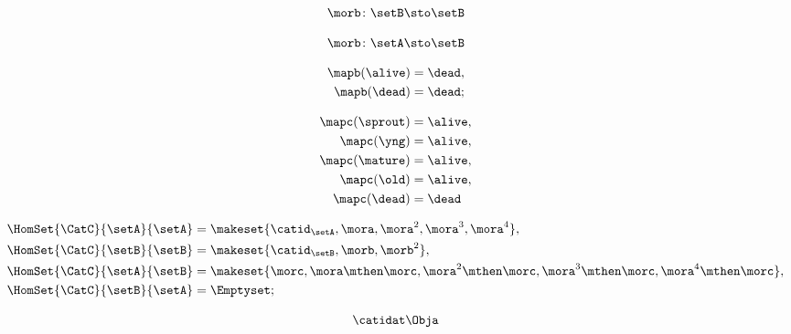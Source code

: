 \begin{forslides}
    \begin{equation}
        \label{eq:semicats-slides-82a}
        \morb \colon \setB \sto \setB
    \end{equation}
    
    \begin{equation}
        \label{eq:semicats-slides-82b}
        \morb \colon \setA \sto \setB
    \end{equation}

    \begin{equation}
        \label{eq:semicats-slides-83}
        \begin{aligned}
            \mapb(\alive) & =  \dead, \\
            \mapb(\dead)  & =  \dead;
        \end{aligned}
    \end{equation}

    \begin{equation}
        \label{eq:semicats-slides-84}
        \begin{aligned}
            \mapc(\sprout) & = \alive, \\
            \mapc(\yng)    & =  \alive, \\
            \mapc(\mature) & = \alive , \\
            \mapc( \old)   & = \alive, \\
            \mapc (\dead)  & = \dead
        \end{aligned}
    \end{equation}

    \begin{equation}
        \label{eq:semicats-slides-85}
        \begin{aligned}
            \HomSet{\CatC}{\setA}{\setA} & = \makeset{ \catid_\setA, \mora, \mora^2, \mora^3, \mora^4 }, \\
            \HomSet{\CatC}{\setB}{\setB} & =  \makeset{ \catid_\setB, \morb, \morb^2 }, \\
            \HomSet{\CatC}{\setA}{\setB} & =  \makeset{ \morc, \mora \mthen \morc, \mora^2 \mthen \morc, \mora^3 \mthen \morc, \mora^4 \mthen \morc}, \\
            \HomSet{\CatC}{\setB}{\setA} & = \Emptyset;
        \end{aligned}
    \end{equation}

    \begin{equation}
        \label{eq:semicats-slides-86}
        \catidat\Obja
    \end{equation}


\end{forslides}
